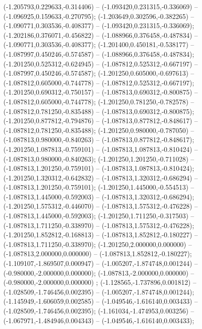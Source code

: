  (-1.205793,0.229633,-0.314406) -- (-1.093420,0.231315,-0.336069) -- (-1.096925,0.159633,-0.270795);
 (-1.203649,0.302596,-0.382265) -- (-1.090771,0.303536,-0.408377) -- (-1.093420,0.231315,-0.336069);
 (-1.202186,0.376071,-0.456822) -- (-1.088966,0.376458,-0.487834) -- (-1.090771,0.303536,-0.408377);
 (-1.201400,0.450181,-0.538177) -- (-1.087997,0.450246,-0.574587) -- (-1.088966,0.376458,-0.487834);
 (-1.201250,0.525312,-0.624945) -- (-1.087812,0.525312,-0.667197) -- (-1.087997,0.450246,-0.574587);
 (-1.201250,0.605000,-0.697613) -- (-1.087812,0.605000,-0.744778) -- (-1.087812,0.525312,-0.667197);
 (-1.201250,0.690312,-0.750157) -- (-1.087813,0.690312,-0.800875) -- (-1.087812,0.605000,-0.744778);
 (-1.201250,0.781250,-0.782578) -- (-1.087812,0.781250,-0.835488) -- (-1.087813,0.690312,-0.800875);
 (-1.201250,0.877812,-0.794876) -- (-1.087813,0.877812,-0.848617) -- (-1.087812,0.781250,-0.835488);
 (-1.201250,0.980000,-0.787050) -- (-1.087813,0.980000,-0.840263) -- (-1.087813,0.877812,-0.848617);
 (-1.201250,1.087813,-0.759101) -- (-1.087813,1.087813,-0.810424) -- (-1.087813,0.980000,-0.840263);
 (-1.201250,1.201250,-0.711028) -- (-1.087813,1.201250,-0.759101) -- (-1.087813,1.087813,-0.810424);
 (-1.201250,1.320312,-0.642832) -- (-1.087813,1.320312,-0.686294) -- (-1.087813,1.201250,-0.759101);
 (-1.201250,1.445000,-0.554513) -- (-1.087813,1.445000,-0.592003) -- (-1.087813,1.320312,-0.686294);
 (-1.201250,1.575312,-0.446070) -- (-1.087813,1.575312,-0.476228) -- (-1.087813,1.445000,-0.592003);
 (-1.201250,1.711250,-0.317503) -- (-1.087813,1.711250,-0.338970) -- (-1.087813,1.575312,-0.476228);
 (-1.201250,1.852812,-0.168813) -- (-1.087813,1.852812,-0.180227) -- (-1.087813,1.711250,-0.338970);
 (-1.201250,2.000000,0.000000) -- (-1.087813,2.000000,0.000000) -- (-1.087813,1.852812,-0.180227);
 (-1.109107,-1.869507,0.000947) -- (-1.005207,-1.874748,0.001244) -- (-0.980000,-2.000000,0.000000);
 (-1.087813,-2.000000,0.000000) -- (-0.980000,-2.000000,0.000000) ;
 (-1.128565,-1.737896,0.001812) -- (-1.028509,-1.746456,0.002395) -- (-1.005207,-1.874748,0.001244);
 (-1.145949,-1.606059,0.002585) -- (-1.049546,-1.616140,0.003433) -- (-1.028509,-1.746456,0.002395);
 (-1.161034,-1.474953,0.003256) -- (-1.067971,-1.484946,0.004343) -- (-1.049546,-1.616140,0.003433);
